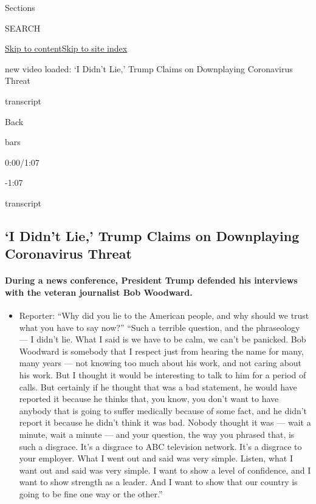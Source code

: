 Sections

SEARCH

\protect\hyperlink{site-content}{Skip to
content}\protect\hyperlink{site-index}{Skip to site index}

new video loaded: `I Didn't Lie,' Trump Claims on Downplaying
Coronavirus Threat

transcript

Back

bars

0:00/1:07

-1:07

transcript

\hypertarget{i-didnt-lie-trump-claims-on-downplaying-coronavirus-threat}{%
\subsection{`I Didn't Lie,' Trump Claims on Downplaying Coronavirus
Threat}\label{i-didnt-lie-trump-claims-on-downplaying-coronavirus-threat}}

\hypertarget{during-a-news-conference-president-trump-defended-his-interviews-with-the-veteran-journalist-bob-woodward}{%
\paragraph{During a news conference, President Trump defended his
interviews with the veteran journalist Bob
Woodward.}\label{during-a-news-conference-president-trump-defended-his-interviews-with-the-veteran-journalist-bob-woodward}}

\begin{itemize}
\tightlist
\item
  Reporter: ``Why did you lie to the American people, and why should we
  trust what you have to say now?'' ``Such a terrible question, and the
  phraseology --- I didn't lie. What I said is we have to be calm, we
  can't be panicked. Bob Woodward is somebody that I respect just from
  hearing the name for many, many years --- not knowing too much about
  his work, and not caring about his work. But I thought it would be
  interesting to talk to him for a period of calls. But certainly if he
  thought that was a bad statement, he would have reported it because he
  thinks that, you know, you don't want to have anybody that is going to
  suffer medically because of some fact, and he didn't report it because
  he didn't think it was bad. Nobody thought it was --- wait a minute,
  wait a minute --- and your question, the way you phrased that, is such
  a disgrace. It's a disgrace to ABC television network. It's a disgrace
  to your employer. What I went out and said was very simple. Listen,
  what I want out and said was very simple. I want to show a level of
  confidence, and I want to show strength as a leader. And I want to
  show that our country is going to be fine one way or the other.''
\end{itemize}

